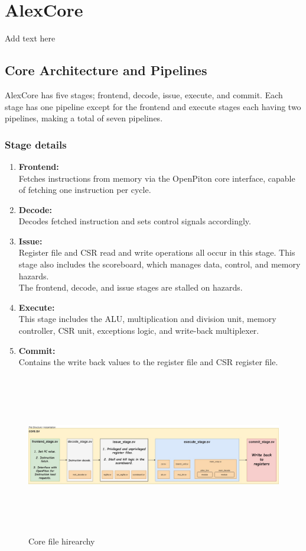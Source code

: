 \documentclass[../main.tex]{subfiles}
\begin{document}
\section{AlexCore}
Add text here


\subsection{Core Architecture and Pipelines}
AlexCore has five stages; frontend, decode, issue, execute, and commit. Each stage has one pipeline except for the frontend and execute stages each having two pipelines, making a total of seven pipelines.

\subsubsection{Stage details}
\begin{enumerate}
  \item \textbf{Frontend:} \\
  Fetches instructions from memory via the OpenPiton core interface, capable of fetching one instruction per cycle.
 \item \textbf{Decode:}\\
 Decodes fetched instruction and sets control signals accordingly. 
 \item \textbf{Issue:}\\
 Register file and CSR  read and write operations all occur in this stage. This stage also includes the scoreboard, which manages data, control, and memory hazards.\\ The frontend, decode, and issue stages are stalled on hazards.
 \item \textbf{Execute:}\\
This stage includes the ALU, multiplication and division unit, memory controller, CSR unit, exceptions logic, and write-back multiplexer.
 \item \textbf{Commit:}\\
 Contains the write back values to the register file and CSR register file. 
\end{enumerate}

\begin{figure}[bh]
\centering
\includegraphics[width=15cm, height=7cm]{diagrams/CoreHirearchy.jpg}

\caption{Core file hirearchy}
\label{fig:files}
\end{figure}
\end{document}
